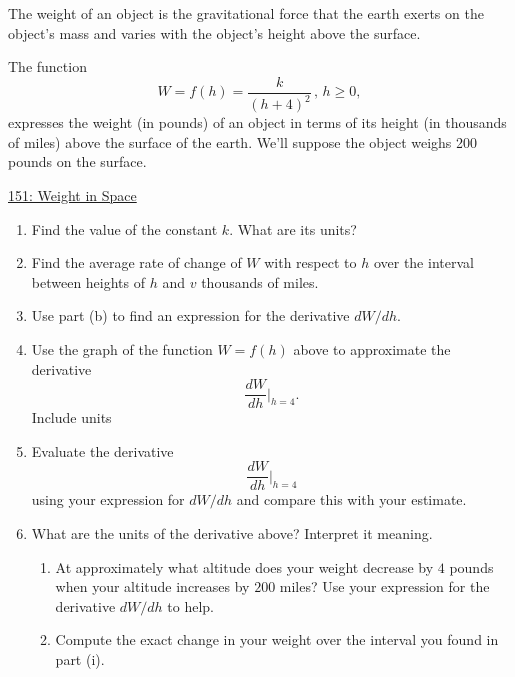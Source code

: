 \documentclass{ximera}
\begin{document}
\begin{question}  \label{Q9df9tthhhg}

The weight of an object is the gravitational force that the earth exerts on the object's mass and varies with the object's height above the surface.

The function 
\[
  W = f(h) = \frac{k}{(h+4)^2} \, , \, h\geq 0,
\]
expresses the weight (in pounds) of an object in terms of its height (in thousands of miles) above the surface of the earth. We'll suppose the object weighs 200 pounds on the surface.

\begin{onlineOnly}
    \begin{center}
\end{center}
\end{onlineOnly}

\href{https://www.desmos.com/calculator/zklsucctjp}{151: Weight in Space}


\begin{enumerate}
\item Find the value of the constant $k$. What are its units?

\item Find the average rate of change of $W$ with respect to $h$ over the interval between heights of $h$ and $v$ thousands of miles.

\item Use part (b) to find an expression for the derivative $dW/dh$.

\item Use the graph of the function $W=f(h)$ above to approximate the derivative
\[
      \frac{dW}{dh}\Big|_{h=4}.
\]
Include units

\item Evaluate the derivative
\[
      \frac{dW}{dh}\Big|_{h=4}
\]
using your expression for $dW/dh$ and compare this with your estimate.

\item What are the units of the derivative above? Interpret it meaning.

\begin{enumerate}

\item At approximately what altitude does your weight decrease by $4$ pounds when your altitude increases by $200$ miles? Use your expression for the derivative $dW/dh$ to help. 

\item Compute the exact change in your weight over the interval you found in part (i).
\end{enumerate}

\end{enumerate}

\end{question}
\end{document}
